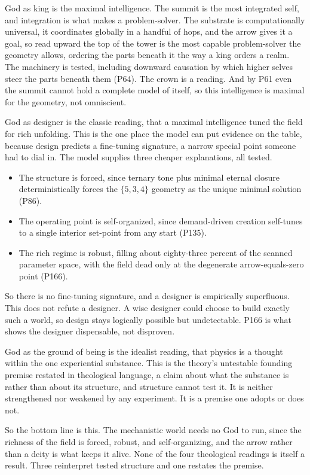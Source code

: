 God as king is the maximal intelligence. The summit is the most integrated self, and integration is what makes a problem-solver. The substrate is computationally universal, it coordinates globally in a handful of hops, and the arrow gives it a goal, so read upward the top of the tower is the most capable problem-solver the geometry allows, ordering the parts beneath it the way a king orders a realm. The machinery is tested, including downward causation by which higher selves steer the parts beneath them (P64). The crown is a reading. And by P61 even the summit cannot hold a complete model of itself, so this intelligence is maximal for the geometry, not omniscient.

God as designer is the classic reading, that a maximal intelligence tuned the field for rich unfolding. This is the one place the model can put evidence on the table, because design predicts a fine-tuning signature, a narrow special point someone had to dial in. The model supplies three cheaper explanations, all tested.

\begin{itemize}
\item The structure is forced, since ternary tone plus minimal eternal closure deterministically forces the $\{5,3,4\}$ geometry as the unique minimal solution (P86).
\item The operating point is self-organized, since demand-driven creation self-tunes to a single interior set-point from any start (P135).
\item The rich regime is robust, filling about eighty-three percent of the scanned parameter space, with the field dead only at the degenerate arrow-equals-zero point (P166).
\end{itemize}

So there is no fine-tuning signature, and a designer is empirically superfluous. This does not refute a designer. A wise designer could choose to build exactly such a world, so design stays logically possible but undetectable. P166 is what shows the designer dispensable, not disproven.

God as the ground of being is the idealist reading, that physics is a thought within the one experiential substance. This is the theory's untestable founding premise restated in theological language, a claim about what the substance is rather than about its structure, and structure cannot test it. It is neither strengthened nor weakened by any experiment. It is a premise one adopts or does not.

So the bottom line is this. The mechanistic world needs no God to run, since the richness of the field is forced, robust, and self-organizing, and the arrow rather than a deity is what keeps it alive. None of the four theological readings is itself a result. Three reinterpret tested structure and one restates the premise.

